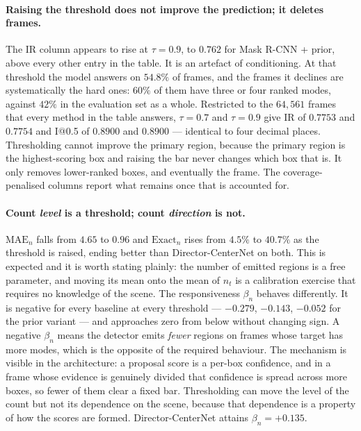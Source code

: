 \documentclass[preprint,12pt]{elsarticle}
\begin{document}
\paragraph{Raising the threshold does not improve the prediction; it deletes
frames.} The IR column appears to rise at $\tau=0.9$, to $0.762$ for
Mask R-CNN + prior, above every other entry in the table. It is an artefact of
conditioning. At that threshold the model answers on $54.8\%$ of frames, and
the frames it declines are systematically the hard ones: $60\%$ of them have
three or four ranked modes, against $42\%$ in the evaluation set as a whole.
Restricted to the $64{,}561$ frames that every method in the table answers,
$\tau=0.7$ and $\tau=0.9$ give IR of $0.7753$ and $0.7754$ and
I@0.5 of $0.8900$ and $0.8900$ — identical to four decimal places. Thresholding
cannot improve the primary region, because the primary region is the
highest-scoring box and raising the bar never changes which box that is. It
only removes lower-ranked boxes, and eventually the frame. The
coverage-penalised columns report what remains once that is accounted for.

\paragraph{Count \emph{level} is a threshold; count \emph{direction} is not.}
$\text{MAE}_n$ falls from $4.65$ to $0.96$ and $\text{Exact}_n$ rises from
$4.5\%$ to $40.7\%$ as the threshold is raised, ending better than
Director-CenterNet on both. This is expected and it is worth stating plainly:
the number of emitted regions is a free parameter, and moving its mean onto the
mean of $n_t$ is a calibration exercise that requires no knowledge of the scene.
The responsiveness $\beta_n$ behaves differently. It is negative for every
baseline at every threshold — $-0.279$, $-0.143$, $-0.052$ for the prior
variant — and approaches zero from below without changing sign. A negative
$\beta_n$ means the detector emits \emph{fewer} regions on frames whose target
has more modes, which is the opposite of the required behaviour. The mechanism
is visible in the architecture: a proposal score is a per-box confidence, and in
a frame whose evidence is genuinely divided that confidence is spread across
more boxes, so fewer of them clear a fixed bar. Thresholding can move the level
of the count but not its dependence on the scene, because that dependence is a
property of how the scores are formed. Director-CenterNet attains
$\beta_n = +0.135$.
\end{document}
